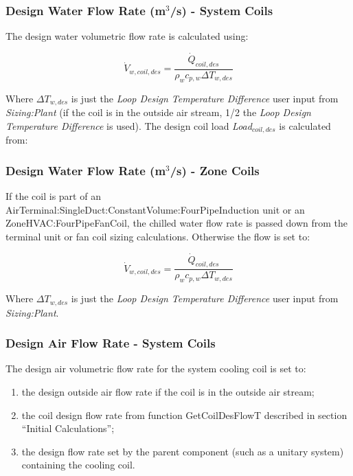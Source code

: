 \subsubsection{\texorpdfstring{Design Water Flow Rate (m\(^{3}\)/s) - System Coils}{Design Water Flow Rate (m\^{}\{3\}/s) - System Coils}}\label{design-water-flow-rate-m3s---system-coils}

The design water volumetric flow rate is calculated using:

\begin{equation}
\dot{V}_{w,coil,des} = \frac{\dot{Q}_{coil,des}}{\rho_w c_{p,w} \Delta T_{w,des}}
\end{equation}

Where \(\Delta T_{w,des}\) is just the \emph{Loop Design Temperature Difference} user input from \emph{Sizing:Plant} (if the coil is in the outside air stream, 1/2 the \emph{Loop Design Temperature Difference} is used). The design coil load \emph{Load\(_{coil,des}\)} is calculated from:

\subsubsection{\texorpdfstring{Design Water Flow Rate (m\(^{3}\)/s) - Zone Coils}{Design Water Flow Rate (m\^{}\{3\}/s) - Zone Coils}}\label{design-water-flow-rate-m3s---zone-coils}

If the coil is part of an AirTerminal:SingleDuct:ConstantVolume:FourPipeInduction unit or an ZoneHVAC:FourPipeFanCoil, the chilled water flow rate is passed down from the terminal unit or fan coil sizing calculations. Otherwise the flow is set to:

\begin{equation}
\dot{V}_{w,coil,des} = \frac{\dot{Q}_{coil,des}}{\rho_w c_{p,w} \Delta T_{w,des}}
\end{equation}

Where \(\Delta T_{w,des}\) is just the \emph{Loop Design Temperature Difference} user input from \emph{Sizing:Plant}.

\subsubsection{Design Air Flow Rate - System Coils}\label{design-air-flow-rate---system-coils}

The design air volumetric flow rate for the system cooling coil is set to:

\begin{enumerate}
\def\labelenumi{\arabic{enumi}.}
\item
  the design outside air flow rate if the coil is in the outside air stream;
\item
  the coil design flow rate from function GetCoilDesFlowT described in section ``Initial Calculations'';
\item
  the design flow rate set by the parent component (such as a unitary system) containing the cooling coil.
\end{enumerate}


